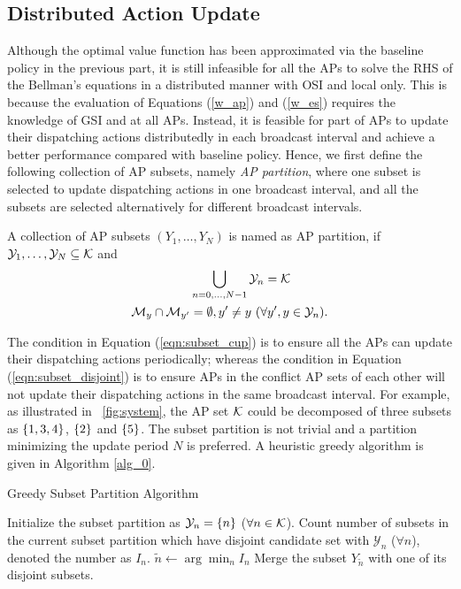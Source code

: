 \subsection{Distributed Action Update}
\label{subsec:chapter3-ap_alg}
Although the optimal value function has been approximated via the baseline policy in the previous part, it is still infeasible for all the APs to solve the RHS of the Bellman's equations in a distributed manner with OSI and local {\brlatency} only.
This is because the evaluation of Equations (\ref{w_ap}) and (\ref{w_es}) requires the knowledge of GSI and {\brlatency} at all APs.
Instead, it is feasible for part of APs to update their dispatching actions distributedly in each broadcast interval and achieve a better performance compared with baseline policy.
Hence, we first define the following collection of AP subsets, namely \emph{AP partition}, where one subset is selected to update dispatching actions in one broadcast interval, and all the subsets are selected alternatively for different broadcast {intervals}.
\begin{definition}[AP Partition]
    A collection of AP subsets $(Y_1, \dots, Y_N)$ is named as AP partition, if $\mathcal{Y}_{1}, \dots, \mathcal{Y}_{N} \subseteq \mathcal{K}$ and
    \begin{align}
        &\bigcup_{n=0,\dots,N-1} \mathcal{Y}_{n} = \mathcal{K}
        \label{eqn:subset_cup}
        \\
        \mathcal{M}_{y} \cap \mathcal{M}_{y'} &=\emptyset, y' \neq y~(\forall y',y \in \mathcal{Y}_{n}).
        \label{eqn:subset_disjoint}
    \end{align}
\end{definition}

The condition in Equation (\ref{eqn:subset_cup}) is to ensure all the APs can update their dispatching actions periodically; whereas the condition in Equation (\ref{eqn:subset_disjoint}) is to ensure APs in the conflict AP sets of each other will not update their dispatching actions in the same broadcast interval.
For example, as illustrated in \figurename~\ref{fig:system}, the AP set $\mathcal{K}$ could be decomposed of three subsets as $\{1,3,4\}$, $\{2\}$ and $\{5\}$.
The subset partition is not trivial and a partition minimizing the update period $N$ is preferred.
A heuristic greedy algorithm is given in Algorithm \ref{alg_0}.
\begin{algorithm}[ht]
    \caption{Greedy Subset Partition Algorithm}\label{alg_0}
    \DontPrintSemicolon
    Initialize the subset partition as $\mathcal{Y}_{n} = \{n\}$ ($\forall n\in\mathcal{K}$).\;
    {
        Count number of subsets in the current subset partition which have disjoint candidate set with $\mathcal{Y}_n$ ($\forall n$), denoted the number as $I_{n}$.\;
        $\tilde{n} \gets \arg\min_{n} I_{n}$\;
        Merge the subset $Y_{\tilde{n}}$ with one of its disjoint subsets.\;
    }
\end{algorithm}

